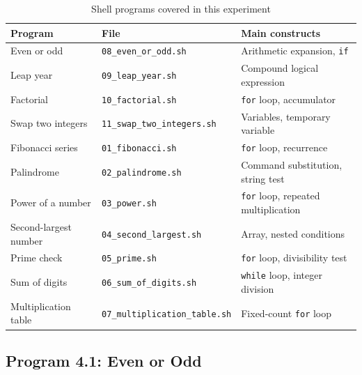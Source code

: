 \begin{table}[H]
\centering
\small
\renewcommand{\arraystretch}{1.2}
\begin{tabularx}{\textwidth}{|p{3.6cm}|>{\raggedright\arraybackslash}p{5.3cm}|>{\raggedright\arraybackslash}X|}
\hline
\textbf{Program} & \textbf{File} & \textbf{Main constructs} \\ \hline
Even or odd & \texttt{08\_even\_or\_odd.sh} & Arithmetic expansion, \texttt{if} \\ \hline
Leap year & \texttt{09\_leap\_year.sh} & Compound logical expression \\ \hline
Factorial & \texttt{10\_factorial.sh} & \texttt{for} loop, accumulator \\ \hline
Swap two integers & \texttt{11\_swap\_two\_integers.sh} & Variables, temporary variable \\ \hline
Fibonacci series & \texttt{01\_fibonacci.sh} & \texttt{for} loop, recurrence \\ \hline
Palindrome & \texttt{02\_palindrome.sh} & Command substitution, string test \\ \hline
Power of a number & \texttt{03\_power.sh} & \texttt{for} loop, repeated multiplication \\ \hline
Second-largest number & \texttt{04\_second\_largest.sh} & Array, nested conditions \\ \hline
Prime check & \texttt{05\_prime.sh} & \texttt{for} loop, divisibility test \\ \hline
Sum of digits & \texttt{06\_sum\_of\_digits.sh} & \texttt{while} loop, integer division \\ \hline
Multiplication table & \texttt{07\_multiplication\_table.sh} & Fixed-count \texttt{for} loop \\ \hline
\end{tabularx}
\caption{Shell programs covered in this experiment}
\end{table}

\subsection{Program 4.1: Even or Odd}



